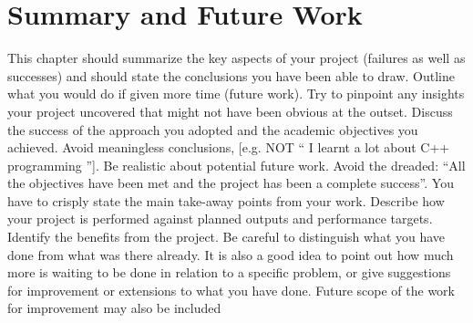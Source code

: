\chapter{Summary and Future Work}
This chapter should summarize the key aspects of your project (failures as well as successes) and should state the conclusions you have been able to draw.  Outline what you would do if given more time (future work).  Try to pinpoint any insights your project uncovered that might not have been obvious at the outset.  Discuss the success of the approach you adopted and the academic objectives you achieved.  Avoid meaningless conclusions, [e.g. NOT `` I learnt a lot about C++ programming ''].  Be realistic about potential future work.  Avoid the dreaded: ``All the objectives have been met and the project has been a complete success''.  You have to crisply state the main take-away points from your work.  Describe how your project is performed against planned outputs and performance targets.  Identify the benefits from the project.  Be careful to distinguish what you have done from what was there already.  It is also a good idea to point out how much more is waiting to be done in relation to a specific problem, or give suggestions for improvement or extensions to what you have done.  
Future scope of the work for improvement may also be included

